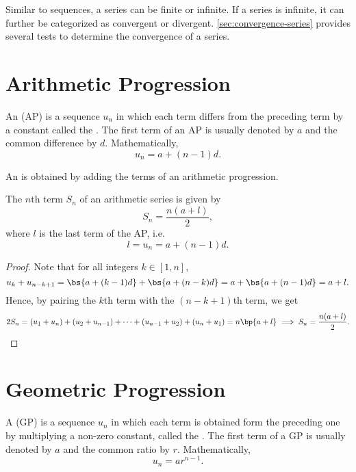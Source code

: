 Similar to sequences, a series can be finite or infinite. If a series is infinite, it can further be categorized as convergent or divergent. \SS\ref{sec:convergence-series} provides several tests to determine the convergence of a series.

\section{Arithmetic Progression}

\begin{definition}
    An  (AP) is a sequence $u_n$ in which each term differs from the preceding term by a constant called the . The first term of an AP is usually denoted by $a$ and the common difference by $d$. Mathematically, \[u_n = a + (n-1)d.\]
\end{definition}

\begin{definition}
    An  is obtained by adding the terms of an arithmetic progression.
\end{definition}

\begin{proposition}
    The $n$th term $S_n$ of an arithmetic series is given by \[S_n = \frac{n(a + l)}{2},\] where $l$ is the last term of the AP, i.e. \[l = u_n = a + (n-1) d.\]
\end{proposition}
\begin{proof}
    Note that for all integers $k \in [1, n]$, \[u_k + u_{n - k + 1} = \bs{a + (k-1)d} + \bs{a + (n-k)d} = a + \bs{a + (n-1)d} = a + l.\] Hence, by pairing the $k$th term with the $(n-k+1)$th term, we get \[2S_n = (u_1 + u_n) + (u_2 + u_{n-1}) + \dots + (u_{n-1} + u_2) + (u_n + u_1) = n\bp{a + l} \implies S_n = \frac{n(a + l)}{2}.\]
\end{proof}

\section{Geometric Progression}

\begin{definition}
    A  (GP) is a sequence $u_n$ in which each term is obtained form the preceding one by multiplying a non-zero constant, called the . The first term of a GP is usually denoted by $a$ and the common ratio by $r$. Mathematically, \[u_n = ar^{n-1}.\]
\end{definition}

